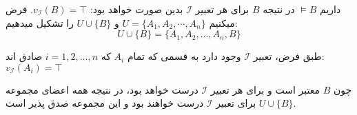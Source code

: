 \documentclass[]{exam}
\begin{document}
    داریم
    $\models B$
    در نتیجه
    $B$
    برای هر تعبیر 
    $\mathscr{I}$
    بدین صورت خواهد بود:
    $v_\mathscr{I} (B) = \top$.
    فرض میکنیم 
    $U = \{A_1, A_2, \cdots, A_n\}$
    و
    $U \cup \{B\}$
    را تشکیل میدهیم:
    $$U \cup \{B\} = \{A_1, A_2, \dots, A_n, B\}$$

    طبق فرض، تعبیر
    $\mathscr{I}$
    وجود دارد به قسمی که تمام
    $A_i$ 
    که
    $i = 1, 2, \dots, n$
    صادق اند:
    $v_\mathscr{I} (A_i) = \top$

    چون
    $B$
    معتبر است و برای هر تعبیر 
    $\mathscr{I}$
    درست خواهد بود، در نتیجه همه اعضای مجموعه
    $U \cup \{B\}$
    برای تعبیر
    $\mathscr{I}$
    درست خواهند بود و این مجموعه صدق پذیر است.
    
\end{document}
